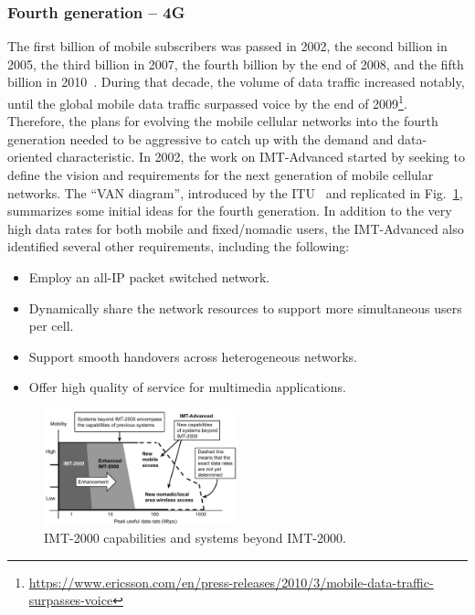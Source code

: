 \subsubsection*{Fourth generation -- 4G}

The first billion of mobile subscribers was passed in 2002, the second billion in 2005, the third billion in 2007, the fourth billion by the end of 2008, and the fifth billion in 2010~\cite{holma2011lte}. During that decade, the volume of data traffic increased notably, until the global mobile data traffic surpassed voice by the end of 2009\footnote{\url{https://www.ericsson.com/en/press-releases/2010/3/mobile-data-traffic-surpasses-voice}}. Therefore, the plans for evolving the mobile cellular networks into the fourth generation needed to be aggressive to catch up with the demand and data-oriented characteristic. In 2002, the work on IMT-Advanced started by seeking to define the vision and requirements for the next generation of mobile cellular networks. The ``VAN diagram'', introduced by the ITU~\cite{itu:03} and replicated in Fig.~\ref{fig:imt-adv}, summarizes some initial ideas for the fourth generation. In addition to the very high data rates for both mobile and fixed/nomadic users, the IMT-Advanced also identified several other requirements, including the following:
\begin{itemize}
    \item Employ an all-IP packet switched network.
    \item Dynamically share the network resources to support more simultaneous users per cell.
    \item Support smooth handovers across heterogeneous networks.
    \item Offer high quality of service for multimedia applications.
\end{itemize}

\begin{figure}[htb]
 \begin{center}
    \includegraphics[width=0.5\textwidth]{figs/imt-adv.pdf}
  \end{center}
\caption{IMT-2000 capabilities and systems beyond IMT-2000.}
\label{fig:imt-adv}
\end{figure}

